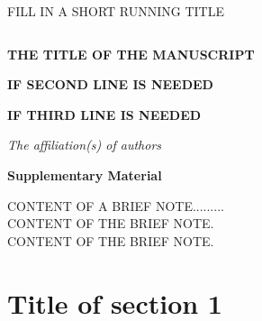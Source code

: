 \documentclass[10pt]{book}
\theoremstyle{definition}
\begin{document}

\renewcommand{\baselinestretch}{2}


{\hfill {\footnotesize\rm FILL IN A SHORT RUNNING TITLE} \hfill}

\renewcommand{\thefootnote}{}
$\ $\par \fontsize{12}{14pt plus.8pt minus .6pt}\selectfont


 \centerline{\large\bf THE TITLE OF THE MANUSCRIPT}
\vspace{2pt}
 \centerline{\large\bf IF SECOND LINE IS NEEDED}
\vspace{2pt}
 \centerline{\large\bf IF THIRD LINE IS NEEDED}
\vspace{.25cm}
 \author{Author(s)}
\vspace{.4cm}
 \centerline{\it The affiliation(s) of authors}
\vspace{.55cm}
 \centerline{\bf Supplementary Material}
\vspace{.55cm}
\fontsize{9}{11.5pt plus.8pt minus .6pt}\selectfont
\noindent
CONTENT OF A BRIEF NOTE.........\\
CONTENT OF THE BRIEF NOTE.\\
CONTENT OF THE BRIEF NOTE.\\
\par

\setcounter{section}{0}
\setcounter{equation}{0}
\def\theequation{S\arabic{section}.\arabic{equation}}
\def\thesection{S\arabic{section}}

\fontsize{12}{14pt plus.8pt minus .6pt}\selectfont

\section{Title of section 1}
\end{document}
